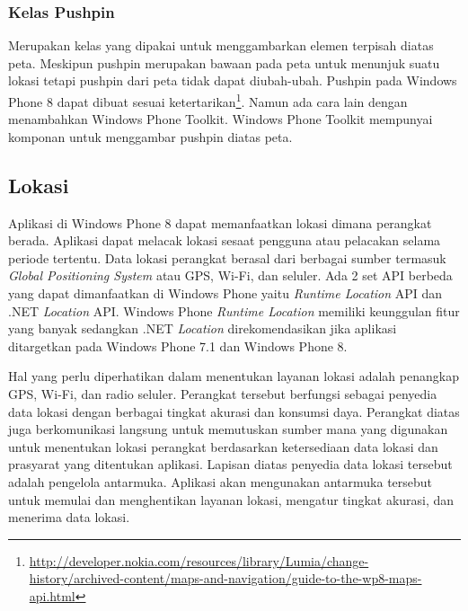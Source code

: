 \subsubsection{Kelas Pushpin}
\label{subsubsec:Kelas Pushpin}
\hspace{0.5cm} Merupakan kelas yang dipakai untuk menggambarkan elemen terpisah diatas peta. Meskipun pushpin merupakan bawaan pada peta untuk menunjuk suatu lokasi tetapi pushpin dari peta tidak dapat diubah-ubah. Pushpin pada Windows Phone 8 dapat dibuat sesuai ketertarikan\footnote{\url{http://developer.nokia.com/resources/library/Lumia/change-history/archived-content/maps-and-navigation/guide-to-the-wp8-maps-api.html}}. Namun ada cara lain dengan menambahkan Windows Phone Toolkit. Windows Phone Toolkit mempunyai komponan untuk menggambar pushpin diatas peta.  

\subsection{Lokasi}
\label{subsec:Lokasi}
\hspace{0.5cm} Aplikasi di Windows Phone 8 dapat memanfaatkan lokasi dimana perangkat berada. Aplikasi dapat melacak lokasi sesaat  pengguna atau pelacakan selama periode tertentu. Data lokasi perangkat berasal dari berbagai sumber termasuk \textit{Global Positioning System} atau GPS, Wi-Fi, dan seluler. Ada 2 set API berbeda yang dapat dimanfaatkan di Windows Phone yaitu \textit{Runtime Location} API dan .NET \textit{Location} API. Windows Phone \textit{Runtime Location} memiliki keunggulan fitur yang banyak sedangkan .NET \textit{Location} direkomendasikan jika aplikasi ditargetkan pada Windows Phone 7.1 dan Windows Phone 8.

\hspace{0.5cm} Hal yang perlu diperhatikan dalam menentukan layanan lokasi adalah penangkap GPS, Wi-Fi, dan radio seluler. Perangkat tersebut berfungsi sebagai penyedia data lokasi dengan berbagai tingkat akurasi dan konsumsi daya. Perangkat diatas juga berkomunikasi langsung untuk memutuskan sumber mana yang digunakan untuk menentukan lokasi perangkat berdasarkan ketersediaan data lokasi dan prasyarat yang ditentukan aplikasi. Lapisan diatas penyedia data lokasi tersebut adalah pengelola antarmuka. Aplikasi akan mengunakan antarmuka tersebut untuk memulai dan menghentikan layanan lokasi, mengatur tingkat akurasi, dan menerima data lokasi.

